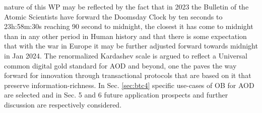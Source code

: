 \documentclass[final,5p,times,twocolumn,authoryear]{elsarticle}
\begin{document}
nature of this WP may be reflected by the fact that in 2023 the Bulletin of the Atomic Scientists have forward the Doomsday Clock by ten seconds to 23h:58m:30s reaching 90 second to midnight, the closest it has come to midnight than in any other period in Human history and that there is some expectation that with the war in Europe it may be further adjusted forward towards midnight in Jan 2024. The renormalized Kardashev scale is argued to reflect a Universal common digital gold standard for AOD and beyond, one the paves the way forward for innovation through transactional protocols that are based on it that preserve information-richness.  In Sec. \ref{sec:btc4} specific use-cases of OB for AOD are selected and in Sec. 5 and 6 future application prospects and further discussion are respectively considered.


\end{document}
